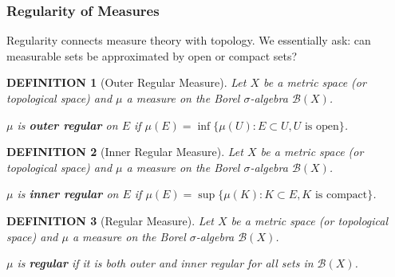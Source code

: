 \documentclass[12pt]{article}
\theoremstyle{blueplain}
\theoremstyle{bluedef}
\newtheorem{definition}{DEFINITION}[section]
\theoremstyle{blueremark}
\numberwithin{equation}{section}
\begin{document}
\subsubsection{Regularity of Measures}

Regularity connects measure theory with topology. We essentially ask: can measurable sets be approximated by open or compact sets?

\begin{definition}[Outer Regular Measure]
  Let $X$ be a metric space (or topological space) and $\mu$ a measure on the Borel $\sigma$-algebra $\mathcal{B}(X)$.

  $\mu$ is \textbf{outer regular} on $E$ if $\mu(E) = \inf \{ \mu(U) : E \subset U, U \text{ is open} \}$.
\end{definition}

\begin{definition}[Inner Regular Measure]
  Let $X$ be a metric space (or topological space) and $\mu$ a measure on the Borel $\sigma$-algebra $\mathcal{B}(X)$.

  $\mu$ is \textbf{inner regular} on $E$ if $\mu(E) = \sup \{ \mu(K) : K \subset E, K \text{ is compact} \}$.
\end{definition}

\begin{definition}[Regular Measure]
  Let $X$ be a metric space (or topological space) and $\mu$ a measure on the Borel $\sigma$-algebra $\mathcal{B}(X)$.

  $\mu$ is \textbf{regular} if it is both outer and inner regular for all sets in $\mathcal{B}(X)$.
\end{definition}
\end{document}
